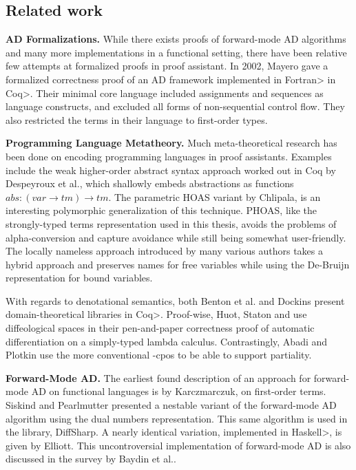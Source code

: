 \subsection{Related work}\label{sec:related-work}
\textbf{AD Formalizations.} While there exists proofs of forward-mode AD algorithms\cite{huot2020correctness}\cite{barthe2020versatility}\cite{10.1145/3371106} and many more implementations\cite{Shaikha2019}\cite{Margossian2019ARO} in a functional setting, there have been relative few attempts at formalized proofs in proof assistant.
In 2002, Mayero gave a formalized correctness proof of an AD framework implemented in \<Fortran> in \<Coq>\cite{Mayero:CorrectnessProofAD}.
Their minimal core language included assignments and sequences as language constructs, and excluded all forms of non-sequential control flow.
They also restricted the terms in their language to first-order types.

\textbf{Programming Language Metatheory.} Much meta-theoretical research has been done on encoding programming languages in proof assistants\cite{Aydemir2005}.
Examples include the weak higher-order abstract syntax approach worked out in Coq by Despeyroux et al.\cite{10.1007/BFb0014049}, which shallowly embeds abstractions as functions $abs : (var \to tm) \to tm$.
The parametric HOAS variant by Chlipala\cite{10.1145/1411204.1411226}, is an interesting polymorphic generalization of this technique.
PHOAS, like the strongly-typed terms representation used in this thesis, avoids the problems of alpha-conversion and capture avoidance while still being somewhat user-friendly.
The locally nameless approach introduced by many various authors\cite{McKinna_Pollack_1997}\cite{10.1007/3-540-57826-9_152}\cite{10.1145/1017472.1017477} takes a hybrid approach and preserves names for free variables while using the De-Bruijn representation for bound variables.

With regards to denotational semantics, both Benton et al.\cite{Benton2009} and Dockins\cite{Dockins2014} present domain-theoretical libraries in \<Coq>.
Proof-wise, Huot, Staton and \Vakar{} use diffeological spaces in their pen-and-paper correctness proof of automatic differentiation on a simply-typed lambda calculus.
Contrastingly, Abadi and Plotkin use the more conventional \omega-cpos to be able to support partiality\cite{10.1145/3371106}.

\textbf{Forward-Mode AD.}
The earliest found description of an approach for forward-mode AD on functional languages is by Karczmarczuk\cite{Karczmarczuk98functionaldifferentiation}, on first-order terms.
Siskind and Pearlmutter presented a nestable variant of the forward-mode AD algorithm using the dual numbers representation\cite{Mark2008NestingFA}.
This same algorithm is used in the \FS{} library, DiffSharp\cite{Baydin2015AutomaticDI}.
A nearly identical variation, implemented in \<Haskell>, is given by Elliott\cite{Elliott2009-beautiful-differentiation}.
This uncontroversial implementation of forward-mode AD is also discussed in the survey by Baydin et al.\cite{Baydin2015AutomaticDI}.

